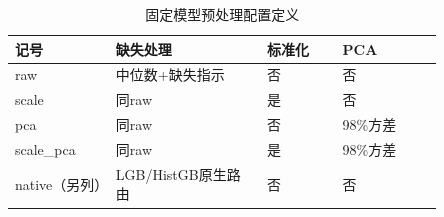 \begin{table}[htbp]
\small
\setlength{\tabcolsep}{5pt}
\centering
\caption{固定模型预处理配置定义}
\label{tab:treatments}
\begin{tabular}{L{0.2\linewidth}L{0.3\linewidth}L{0.15\linewidth}L{0.2\linewidth}}
\toprule
记号 & 缺失处理 & 标准化 & PCA \\
\midrule
raw & 中位数+缺失指示 & 否 & 否 \\
scale & 同raw & 是 & 否 \\
pca & 同raw & 否 & 98\%方差 \\
scale\_pca & 同raw & 是 & 98\%方差 \\
native（另列） & LGB/HistGB原生路由 & 否 & 否 \\
\bottomrule
\end{tabular}
\end{table}

